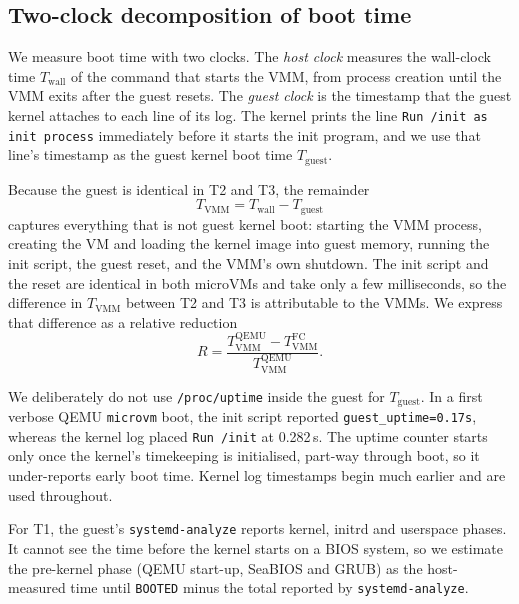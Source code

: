 \documentclass[pdflatex,sn-mathphys-num]{sn-jnl}%
\begin{document}
\subsection{Two-clock decomposition of boot time}

We measure boot time with two clocks. The \emph{host clock} measures the wall-clock time $T_{\mathrm{wall}}$ of the command that starts the VMM, from process creation until the VMM exits after the guest resets. The \emph{guest clock} is the timestamp that the guest kernel attaches to each line of its log. The kernel prints the line \texttt{Run /init as init process} immediately before it starts the init program, and we use that line's timestamp as the guest kernel boot time $T_{\mathrm{guest}}$.

Because the guest is identical in T2 and T3, the remainder
\begin{equation}
T_{\mathrm{VMM}} = T_{\mathrm{wall}} - T_{\mathrm{guest}}
\label{eq:vmm}
\end{equation}
captures everything that is not guest kernel boot: starting the VMM process, creating the VM and loading the kernel image into guest memory, running the init script, the guest reset, and the VMM's own shutdown. The init script and the reset are identical in both microVMs and take only a few milliseconds, so the difference in $T_{\mathrm{VMM}}$ between T2 and T3 is attributable to the VMMs. We express that difference as a relative reduction
\begin{equation}
R = \frac{T_{\mathrm{VMM}}^{\mathrm{QEMU}} - T_{\mathrm{VMM}}^{\mathrm{FC}}}{T_{\mathrm{VMM}}^{\mathrm{QEMU}}}.
\label{eq:red}
\end{equation}

We deliberately do not use \texttt{/proc/uptime} inside the guest for $T_{\mathrm{guest}}$. In a first verbose QEMU \texttt{microvm} boot, the init script reported \texttt{guest\_uptime=0.17s}, whereas the kernel log placed \texttt{Run /init} at 0.282\,s. The uptime counter starts only once the kernel's timekeeping is initialised, part-way through boot, so it under-reports early boot time. Kernel log timestamps begin much earlier and are used throughout.

For T1, the guest's \texttt{systemd-analyze} reports kernel, initrd and userspace phases. It cannot see the time before the kernel starts on a BIOS system, so we estimate the pre-kernel phase (QEMU start-up, SeaBIOS and GRUB) as the host-measured time until \texttt{BOOTED} minus the total reported by \texttt{systemd-analyze}.
\end{document}
